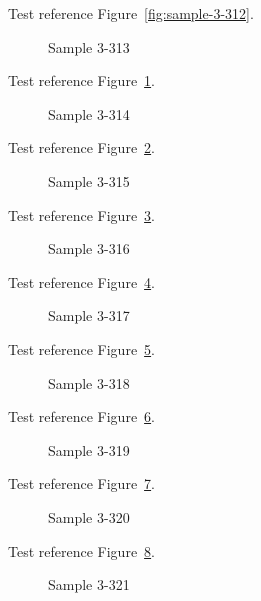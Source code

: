 Test reference Figure~\ref{fig:sample-3-312}.

\begin{figure}[tbhp]
\caption{Sample 3-313}
\label{fig:sample-3-313}
\end{figure}

Test reference Figure~\ref{fig:sample-3-313}.

\begin{figure}[tbhp]
\caption{Sample 3-314}
\label{fig:sample-3-314}
\end{figure}

Test reference Figure~\ref{fig:sample-3-314}.

\begin{figure}[tbhp]
\caption{Sample 3-315}
\label{fig:sample-3-315}
\end{figure}

Test reference Figure~\ref{fig:sample-3-315}.

\begin{figure}[tbhp]
\caption{Sample 3-316}
\label{fig:sample-3-316}
\end{figure}

Test reference Figure~\ref{fig:sample-3-316}.

\begin{figure}[tbhp]
\caption{Sample 3-317}
\label{fig:sample-3-317}
\end{figure}

Test reference Figure~\ref{fig:sample-3-317}.

\begin{figure}[tbhp]
\caption{Sample 3-318}
\label{fig:sample-3-318}
\end{figure}

Test reference Figure~\ref{fig:sample-3-318}.

\begin{figure}[tbhp]
\caption{Sample 3-319}
\label{fig:sample-3-319}
\end{figure}

Test reference Figure~\ref{fig:sample-3-319}.

\begin{figure}[tbhp]
\caption{Sample 3-320}
\label{fig:sample-3-320}
\end{figure}

Test reference Figure~\ref{fig:sample-3-320}.

\begin{figure}[tbhp]
\caption{Sample 3-321}
\label{fig:sample-3-321}
\end{figure}

